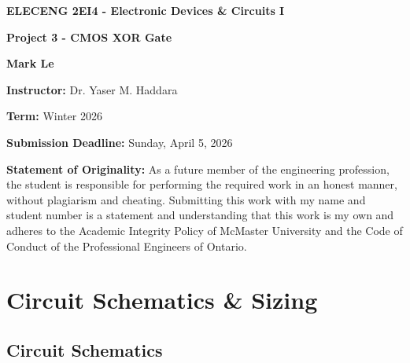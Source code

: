 \documentclass[12pt]{article}
\begin{document}
    
    \begin{titlepage}
    \begin{center}
    \vspace*{\fill}

    {\LARGE \textbf{ELECENG 2EI4 - Electronic Devices \& Circuits I}\par}
    \vspace{2.5cm}

    {\LARGE\bfseries Project 3 - CMOS XOR Gate\par}
    \vspace{2.5cm}
    
    {\Large \textbf{Mark Le}\par}
    \vspace{2.5cm}
    
    {\large \textbf{Instructor:} Dr. Yaser M. Haddara\par}
    \vspace{0.5cm}
    {\large \textbf{Term:} Winter 2026 \par}
    \vspace{0.5cm}
    
    {\large \textbf{Submission Deadline:} Sunday, April 5, 2026\par}
    \end{center}

    \vspace*{\fill}

    \textbf{Statement of Originality:} As a future member of the engineering profession, the student is responsible for performing the required work in an honest manner, without plagiarism and cheating. Submitting this work with my name and student number is a statement and understanding that this work is my own and adheres to the Academic Integrity Policy of McMaster University and the Code of Conduct of the Professional Engineers of Ontario.

\end{titlepage}

    \newpage
    \tableofcontents


    \newpage

    \section{Circuit Schematics \& Sizing}

    \subsection{Circuit Schematics}
\end{document}
